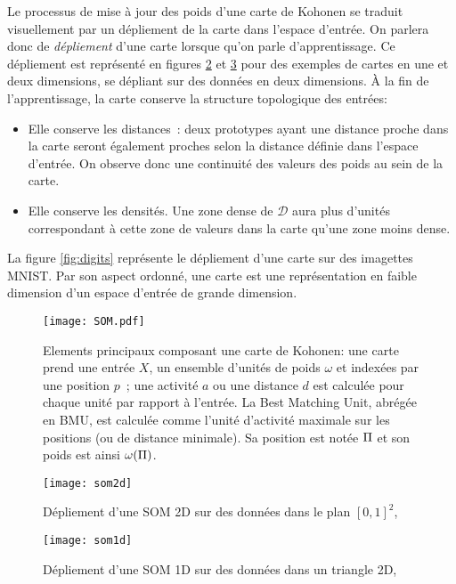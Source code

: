 \documentclass[../main]{subfiles}
\begin{document}
Le processus de mise à jour des poids d'une carte de Kohonen se traduit visuellement par un dépliement de la carte dans l'espace d'entrée. On parlera donc de \emph{dépliement} d'une carte lorsque qu'on parle d'apprentissage. Ce dépliement est représenté en figures \ref{fig:som2d} et \ref{fig:som1d} pour des exemples de cartes en une et deux dimensions, se dépliant sur des données en deux dimensions.
\`A la fin de l'apprentissage, la carte conserve la structure topologique des entrées:
\begin{itemize}
\item Elle conserve les distances~: deux prototypes ayant une distance proche dans la carte seront également proches selon la distance définie dans l'espace d'entrée. On observe donc une continuité des valeurs des poids au sein de la carte.
\item Elle conserve les densités. Une zone dense de $\mathcal{D}$ aura plus d'unités correspondant à cette zone de valeurs dans la carte qu'une zone moins dense.
\end{itemize}
La figure \ref{fig:digits} représente le dépliement d'une carte sur des imagettes MNIST.
Par son aspect ordonné, une carte est une représentation en faible dimension d'un espace d'entrée de grande dimension.

\begin{figure}
    \centering
    \texttt{[image: SOM.pdf]}
    \caption{Elements principaux composant une carte de Kohonen: une carte prend une entrée $X$, un ensemble d'unités de poids $\omega$ et indexées par une position $p$~; une activité $a$ ou une distance $d$ est calculée pour chaque unité par rapport à l'entrée. La Best Matching Unit, abrégée en BMU, est calculée comme l'unité d'activité maximale sur les positions (ou de distance minimale). Sa position est notée $\Pi$ et son poids est ainsi $\omega(\Pi)$.  \label{fig:SOM}}
    \end{figure}

    \begin{figure}
        \centering
        \texttt{[image: som2d]}
        \caption{Dépliement d'une SOM 2D sur des données dans le plan $[0,1]^2$, \cite{Kohonen1995SelfOrganizingM} \label{fig:som2d}}
        
        \end{figure}
        
        \begin{figure}
        \centering
        \texttt{[image: som1d]}
        \caption{Dépliement d'une SOM 1D sur des données dans un triangle 2D, \cite{Kohonen1995SelfOrganizingM}\label{fig:som1d}}
        
        \end{figure}
\end{document}
